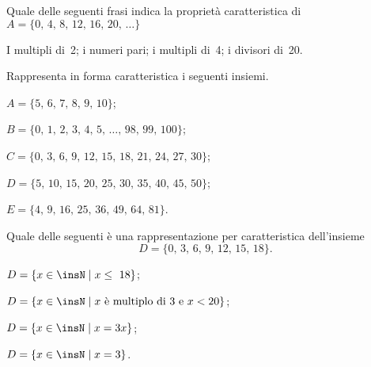 
\begin{esercizio}
\label{ese:6.11}
Quale delle seguenti frasi indica la proprietà caratteristica
di~$A=\{\text{0, 4, 8, 12, 16, 20, }\ldots\}$
\begin{center}
\boxA\quad I multipli di~2; \quad\boxB\quad i numeri pari; \quad\boxC\quad i multipli di~4; \quad\boxD\quad i divisori di~20.
\end{center}
\end{esercizio}

\begin{esercizio}
\label{ese:6.12}
Rappresenta in forma caratteristica i seguenti insiemi.
\begin{multicols}{2}
\begin{enumeratea}
\item $A=\{\text{5, 6, 7, 8, 9, 10}\}$;
\item $B=\{\text{0, 1, 2, 3, 4, 5, \ldots, 98, 99, 100}\}$;
\item $C=\{\text{0, 3, 6, 9, 12, 15, 18, 21, 24, 27, 30}\}$;
\item $D=\{\text{5, 10, 15, 20, 25, 30, 35, 40, 45, 50}\}$;
\item $E=\{\text{4, 9, 16, 25, 36, 49, 64, 81}\}$.
\end{enumeratea}
\end{multicols}
\end{esercizio}

\begin{esercizio}
\label{ese:6.13}
Quale delle seguenti è una rappresentazione per caratteristica
dell'insieme
\[D = \{\text{0, 3, 6, 9, 12, 15, 18}\}.\]
\begin{enumeratea}
\item $D=\{x\in\insN\mid x\le~18\}$;
\item $D=\{x\in\insN\mid x\text{ è multiplo di~3 e }x<20\}$;%
\item $D=\{x\in\insN\mid x=3x\}$;
\item $D=\{x\in\insN\mid x=3\}$.
\end{enumeratea}
\end{esercizio}

